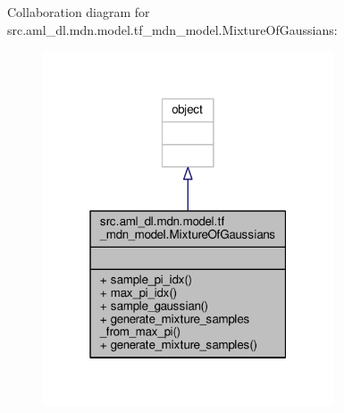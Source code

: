Collaboration diagram for src.\-aml\-\_\-dl.\-mdn.\-model.\-tf\-\_\-mdn\-\_\-model.\-Mixture\-Of\-Gaussians\-:\nopagebreak
\begin{figure}[H]
\begin{center}
\leavevmode
\includegraphics[width=244pt]{classsrc_1_1aml__dl_1_1mdn_1_1model_1_1tf__mdn__model_1_1_mixture_of_gaussians__coll__graph}
\end{center}
\end{figure}

